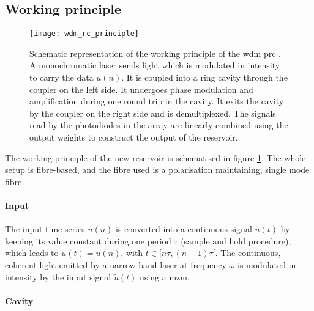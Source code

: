 
\subsection{Working principle}

\begin{figure}[h]
	\centering
	\texttt{[image: wdm\_rc\_principle]}
	\caption{Schematic representation of the working principle of the \gls{wdm} \gls{prc} \cite{AkroutAkram2016Pprc}. A monochromatic laser sends light which is modulated in intensity to carry the data $u(n)$. It is coupled into a ring cavity through the coupler on the left side. It undergoes phase modulation and amplification during one round trip in the cavity. It exits the cavity by the coupler on the right side and is demultiplexed. The signals read by the photodiodes in the array are linearly combined using the output weights to construct the output of the reservoir.}
	\label{wdm_rc_principle}
\end{figure}


The working principle of the new reservoir is schematised in figure \ref{wdm_rc_principle}. The whole setup is fibre-based, and the fibre used is a polarisation maintaining, single mode fibre. 

\paragraph{Input}

The input time series $u(n)$ is converted into a continuous signal $\tilde{u}(t)$ by keeping its value constant during one period $\tau$ (sample and hold procedure), which leads to $\tilde{u}(t)=u(n)$, with $t \in [n\tau, (n+1)\tau[$. The continuous, coherent light emitted by a narrow band laser at frequency $\omega$ is modulated in intensity by the input signal $\tilde{u}(t)$ using a \gls{mzm}.  

\paragraph{Cavity}

